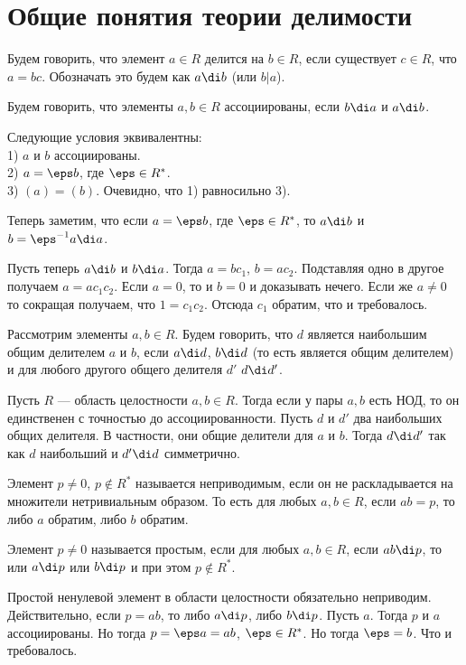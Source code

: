 \section{Общие понятия теории делимости}

 Будем говорить, что элемент $a\in R$ делится на $b \in R$, если существует
$c \in R$, что $a=bc$. Обозначать это будем как $a\di b$ (или $b|a$).
\edfn

 Будем говорить, что элементы $a,b\in R$ ассоциированы, если $b\di a$ и $a \di b$.
\edfn

 Следующие условия эквивалентны:\\
1) $a$ и $b$ ассоциированы.\\
2) $a = \eps b$, где $\eps \in R^*$.\\
3) $(a) = (b)$.
\elm
\proof Очевидно, что 1) равносильно 3). 

Теперь заметим, что если $a = \eps b$, где $\eps \in R^*$, то $a\di b$ и $b=\eps^{-1}a \di a$. 

Пусть теперь $a\di b$ и $b\di a$. Тогда $a=bc_1$, $b=ac_2$. Подставляя одно в другое получаем $a=ac_1c_2$. Если $a=0$, то и $b=0$ и доказывать нечего. Если же $a\neq 0$ то сокращая получаем, что $1=c_1c_2$. Отсюда $c_1$ обратим, что и требовалось.
\endproof

\dfn[НОД] Рассмотрим элементы $a,b\in R$. Будем говорить, что $d$ является наибольшим общим делителем $a$ и $b$, если $a\di d$, $b\di d$ (то есть является общим делителем) и для любого другого общего делителя $d'$ $d\di d'$.
\edfn

 Пусть $R$ --- область целостности $a,b \in R$. Тогда если у пары $a,b$ есть НОД,
то он единственен с точностью до ассоциированности.
\elm
\proof
Пусть $d$ и $d'$ два наибольших общих делителя. В частности, они общие делители для $a$ и $b$. Тогда $d \di d'$ так как $d$ наибольший и $d' \di d$ симметрично.
\endproof

 Элемент $p\neq 0$, $p\notin R^*$ называется неприводимым, если он не раскладывается на множители нетривиальным образом. То есть для любых $a,b \in R$, если $ab=p$, то либо $a$ обратим, либо $b$ обратим.
\edfn

 Элемент $p\neq 0$ называется простым, если  для любых $a,b\in R$, если $ab\di p$, то или $a\di p$ или $b\di p$ и при этом $p\notin R^*$.
\edfn

\utv Простой ненулевой элемент в области целостности обязательно неприводим.
\proof Действительно, если $p=ab$, то либо $a\di p$, либо $b \di p$. Пусть $a$. Тогда $p$ и $a$ ассоциированы. Но тогда $p=\eps a=ab$, $\eps \in R^*$. Но тогда $\eps=b$. Что и требовалось.
\endproof
\eutv

